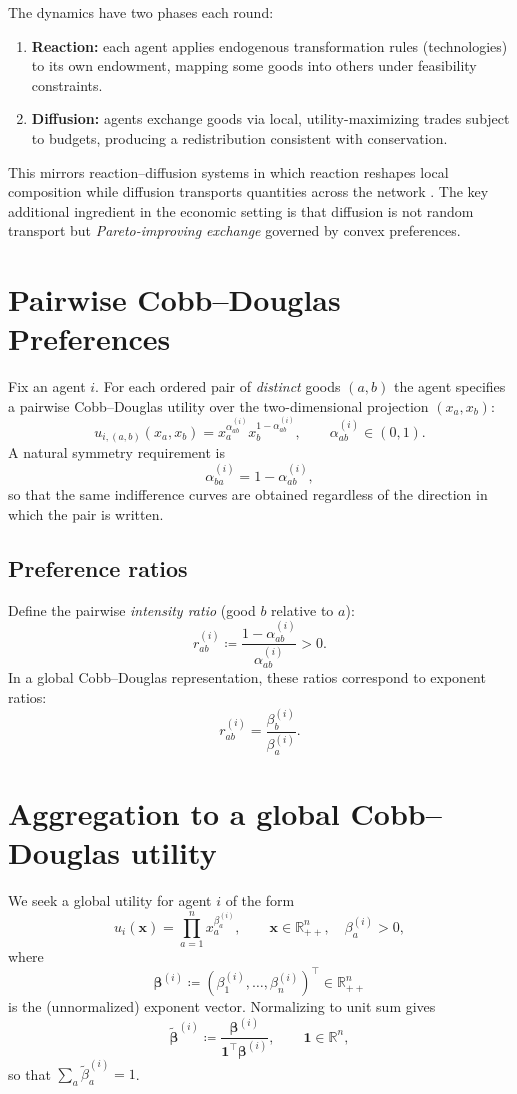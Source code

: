 \documentclass[11pt]{article}
\begin{document}
The dynamics have two phases each round:
\begin{enumerate}[leftmargin=*]
  \item \textbf{Reaction:} each agent applies endogenous transformation rules (technologies) to its own endowment,
        mapping some goods into others under feasibility constraints.
  \item \textbf{Diffusion:} agents exchange goods via local, utility-maximizing trades subject to budgets, producing
        a redistribution consistent with conservation.
\end{enumerate}
This mirrors reaction--diffusion systems in which reaction reshapes local composition while diffusion transports
quantities across the network \parencite{Turing1952}. The key additional ingredient in the economic setting is that
diffusion is not random transport but \emph{Pareto-improving exchange} governed by convex preferences.

\section{Pairwise Cobb--Douglas Preferences}

Fix an agent \(i\). For each ordered pair of \emph{distinct} goods \((a,b)\) the agent specifies a pairwise
Cobb--Douglas utility over the two-dimensional projection \((x_a,x_b)\):
\[
u_{i,(a,b)}(x_a,x_b) = x_a^{\alpha^{(i)}_{ab}} x_b^{1-\alpha^{(i)}_{ab}},
\qquad \alpha^{(i)}_{ab} \in (0,1).
\]
A natural symmetry requirement is
\[
\alpha^{(i)}_{ba} = 1 - \alpha^{(i)}_{ab},
\]
so that the same indifference curves are obtained regardless of the direction in which the pair is written.

\subsection{Preference ratios}

Define the pairwise \emph{intensity ratio} (good \(b\) relative to \(a\)):
\[
r^{(i)}_{ab} \coloneqq \frac{1-\alpha^{(i)}_{ab}}{\alpha^{(i)}_{ab}} > 0.
\]
In a global Cobb--Douglas representation, these ratios correspond to exponent ratios:
\[
r^{(i)}_{ab} = \frac{\beta_b^{(i)}}{\beta_a^{(i)}}.
\]

\section{Aggregation to a global Cobb--Douglas utility}

We seek a global utility for agent \(i\) of the form
\[
u_i(\bm{x}) = \prod_{a=1}^n x_a^{\beta_a^{(i)}},
\qquad \bm{x} \in \mathbb{R}_{++}^n,\quad \beta_a^{(i)} > 0,
\]
where
\[
\bm{\beta}^{(i)} \coloneqq (\beta_1^{(i)},\dots,\beta_n^{(i)})^\top \in \mathbb{R}_{++}^n
\]
is the (unnormalized) exponent vector. Normalizing to unit sum gives
\[
\tilde{\bm{\beta}}^{(i)} \coloneqq \frac{\bm{\beta}^{(i)}}{\bm{1}^\top \bm{\beta}^{(i)}},
\qquad \bm{1} \in \mathbb{R}^n,
\]
so that \(\sum_a \tilde{\beta}^{(i)}_a = 1\).
\end{document}
